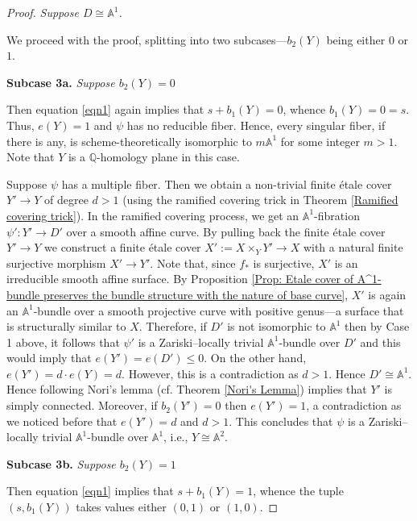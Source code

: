 \documentclass[12pt,reqno,twoside]{amsart}
\theoremstyle{definition}
\numberwithin{equation}{section}
\newcommand{\A}{\mathbb{A}}
\newcommand{\Q}{\mathbb{Q}}
\begin{document}
\begin{proof}
    \medskip
     \emph{Suppose $D\cong \A^1$.}

    \medskip
    We proceed with the proof, splitting into two subcases---$b_2(Y)$ being either $0$ or $1$.
    
    \medskip
    {\bf Subcase 3a.} \emph{Suppose $b_2(Y)=0$}

    \medskip
    Then equation \eqref{eqn1} again implies that $s+b_1(Y)=0$, whence $b_1(Y)=0=s$. Thus, $e(Y)=1$ and $\psi$ has no reducible fiber. Hence, every singular fiber, if there is any, is scheme-theoretically isomorphic to $m\A^1$ for some integer $m>1$. Note that $Y$ is a $\Q$-homology plane in this case. 

    \medskip
    Suppose $\psi$ has a multiple fiber. Then we obtain a non-trivial finite {\'e}tale cover $Y'\to Y$ of degree $d>1$ (using the ramified covering trick in Theorem \ref{Ramified covering trick}). In the ramified covering process, we get an $\A^1$-fibration $\psi':Y'\to D'$ over a smooth affine curve. By pulling back the finite {\'e}tale cover $Y'\to Y$ we construct a finite {\'e}tale cover $X':=X\times_{Y}Y' \to X$ with a natural finite surjective morphism $X' \to Y'$. Note that, since $f_\ast$ is surjective, $X'$ is an irreducible smooth affine surface. By Proposition \ref{Prop: Etale cover of A^1-bundle preserves the bundle structure with the nature of base curve}, $X'$ is again an $\A^1$-bundle over a smooth projective curve with positive genus---a surface that is structurally similar to $X$. Therefore, if $D'$ is not isomorphic to $\A^1$ then by {\sf Case 1} above, it follows that $\psi'$ is a Zariski--locally trivial $\A^1$-bundle over $D'$ and this would imply that $e(Y')=e(D')\leq 0$. On the other hand, $e(Y') = d \cdot e(Y) = d$. However, this is a contradiction as $d>1$. Hence $D'\cong \A^1$. Hence \cite[Remark 3.13, 3.14]{GGH2023} following Nori's lemma (cf. Theorem \ref{Nori's Lemma}) implies that $Y'$ is simply connected. Moreover, if $b_2(Y')=0$ then $e(Y')=1$, a contradiction as we noticed before that $e(Y')=d$ and $d>1$. This concludes that $\psi$ is a Zariski--locally trivial $\A^1$-bundle over $\A^1$, i.e., $Y\cong \A^2$.
    
    \medskip
    {\bf Subcase 3b.} \emph{Suppose $b_2(Y)=1$}

    \medskip
    Then equation \eqref{eqn1} implies that $s+b_1(Y)=1$, whence the tuple $(s, b_1(Y))$ takes values either $(0,1)$ or $(1,0)$. 
    

\end{proof}
\end{document}
